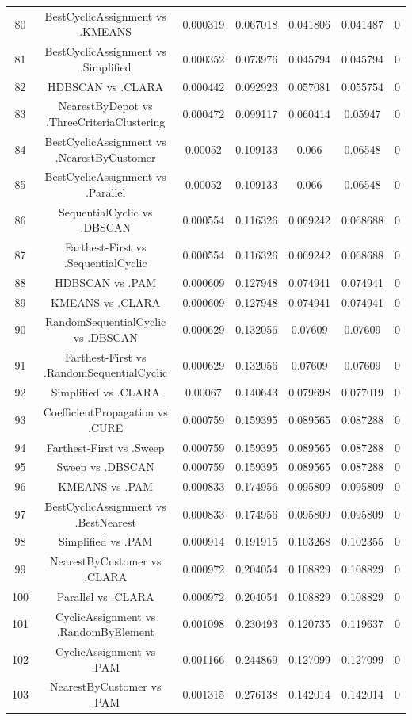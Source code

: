 \documentclass[a4paper,10pt]{article}
\begin{document}
\begin{landscape}
\begin{table}[!htp]
\begin{tabular}{ccccccc}
80&BestCyclicAssignment vs .KMEANS&0.000319&0.067018&0.041806&0.041487&0\\
81&BestCyclicAssignment vs .Simplified&0.000352&0.073976&0.045794&0.045794&0\\
82&HDBSCAN vs .CLARA&0.000442&0.092923&0.057081&0.055754&0\\
83&NearestByDepot vs .ThreeCriteriaClustering&0.000472&0.099117&0.060414&0.05947&0\\
84&BestCyclicAssignment vs .NearestByCustomer&0.00052&0.109133&0.066&0.06548&0\\
85&BestCyclicAssignment vs .Parallel&0.00052&0.109133&0.066&0.06548&0\\
86&SequentialCyclic vs .DBSCAN&0.000554&0.116326&0.069242&0.068688&0\\
87&Farthest-First vs .SequentialCyclic&0.000554&0.116326&0.069242&0.068688&0\\
88&HDBSCAN vs .PAM&0.000609&0.127948&0.074941&0.074941&0\\
89&KMEANS vs .CLARA&0.000609&0.127948&0.074941&0.074941&0\\
90&RandomSequentialCyclic vs .DBSCAN&0.000629&0.132056&0.07609&0.07609&0\\
91&Farthest-First vs .RandomSequentialCyclic&0.000629&0.132056&0.07609&0.07609&0\\
92&Simplified vs .CLARA&0.00067&0.140643&0.079698&0.077019&0\\
93&CoefficientPropagation vs .CURE&0.000759&0.159395&0.089565&0.087288&0\\
94&Farthest-First vs .Sweep&0.000759&0.159395&0.089565&0.087288&0\\
95&Sweep vs .DBSCAN&0.000759&0.159395&0.089565&0.087288&0\\
96&KMEANS vs .PAM&0.000833&0.174956&0.095809&0.095809&0\\
97&BestCyclicAssignment vs .BestNearest&0.000833&0.174956&0.095809&0.095809&0\\
98&Simplified vs .PAM&0.000914&0.191915&0.103268&0.102355&0\\
99&NearestByCustomer vs .CLARA&0.000972&0.204054&0.108829&0.108829&0\\
100&Parallel vs .CLARA&0.000972&0.204054&0.108829&0.108829&0\\
101&CyclicAssignment vs .RandomByElement&0.001098&0.230493&0.120735&0.119637&0\\
102&CyclicAssignment vs .PAM&0.001166&0.244869&0.127099&0.127099&0\\
103&NearestByCustomer vs .PAM&0.001315&0.276138&0.142014&0.142014&0\\

\end{tabular}
\end{table}
\end{landscape}
\end{document}
